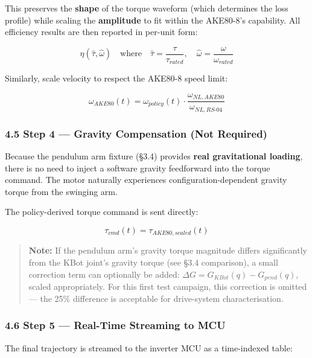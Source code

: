 \documentclass[
]{article}
\begin{document}
This preserves the \textbf{shape} of the torque waveform (which
determines the loss profile) while scaling the \textbf{amplitude} to fit
within the AKE80-8's capability. All efficiency results are then
reported in per-unit form:

\[
\eta(\hat{\tau}, \hat{\omega}) \quad \text{where} \quad \hat{\tau} = \frac{\tau}{\tau_{rated}}, \quad \hat{\omega} = \frac{\omega}{\omega_{rated}}
\]

Similarly, scale velocity to respect the AKE80-8 speed limit:

\[
\omega_{AKE80}(t) = \omega_{policy}(t) \cdot \frac{\omega_{NL,AKE80}}{\omega_{NL,RS\text{-}04}}
\]

\subsubsection{4.5 Step 4 --- Gravity Compensation (Not
Required)}\label{step-4-gravity-compensation-not-required}

Because the pendulum arm fixture (§3.4) provides \textbf{real
gravitational loading}, there is no need to inject a software gravity
feedforward into the torque command. The motor naturally experiences
configuration-dependent gravity torque from the swinging arm.

The policy-derived torque command is sent directly:

\[
\tau_{cmd}(t) = \tau_{AKE80,scaled}(t)
\]

\begin{quote}
\textbf{Note:} If the pendulum arm's gravity torque magnitude differs
significantly from the KBot joint's gravity torque (see §3.4
comparison), a small correction term can optionally be added:
\(\Delta G = G_{KBot}(q) - G_{pend}(q)\), scaled appropriately. For this
first test campaign, this correction is omitted --- the 25\% difference
is acceptable for drive-system characterisation.
\end{quote}

\subsubsection{4.6 Step 5 --- Real-Time Streaming to
MCU}\label{step-5-real-time-streaming-to-mcu}

The final trajectory is streamed to the inverter MCU as a time-indexed
table:
\end{document}
